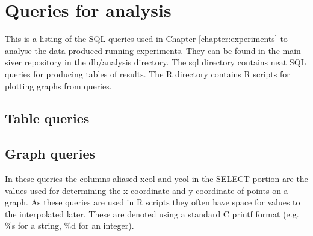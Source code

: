 \chapter{Queries for analysis}\label{appendix:sql}
This is a listing of the SQL queries used in Chapter \ref{chapter:experiments} to analyse the data produced running experiments. They can be found in the main siver repository in the db/analysis directory. The sql directory contains neat SQL queries for producing tables of results. The R directory contains R scripts for plotting graphs from queries.

\section{Table queries}











\section{Graph queries}
In these queries the columns aliased xcol and ycol in the SELECT portion are the values used for determining the x-coordinate and y-coordinate of points on a graph. As these queries are used in R scripts they often have space for values to the interpolated later. These are denoted using a standard C printf format (e.g. \%s for a string, \%d for an integer).





